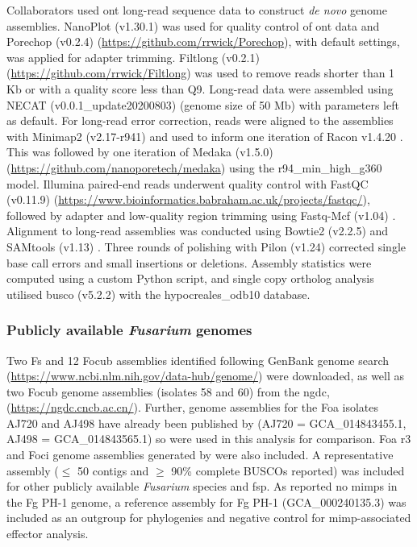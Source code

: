 Collaborators used \Ac{ont} long-read sequence data to construct \textit{de novo} genome assemblies. NanoPlot (v1.30.1) \parencite{DeCoster2018} was used for quality control of \ac{ont} data and Porechop (v0.2.4) (\href{https://github.com/rrwick/Porechop}{https://github.com/rrwic\-k/Porechop}), with default settings, was applied for adapter trimming. Filtlong (v0.2.1)  (\href{https://github.com/rrwick/Filtlong}{https://github.com/rrwick/Filtlong}) was used to remove reads shorter than 1 Kb or with a quality score less than Q9. Long-read data were assembled using NECAT (v0.0.1\_update20200803) \parencite{Chen2021} (genome size of 50 Mb) with parameters left as default. For long-read error correction, reads were aligned to the assemblies with Minimap2 (v2.17-r941) \parencite{Li2018} and used to inform one iteration of Racon v1.4.20 \parencite{Vaser2017}. This was followed by one iteration of Medaka (v1.5.0) (\href{https://github.com/nanoporetech/medaka}{https://github.com/nanoporetech/medaka}) using the r94\_min\_high\_g360 model. Illumina paired-end reads underwent quality control with FastQC (v0.11.9) (\href{https://www.bioinformatics.babraham.ac.uk/projects/fastqc/}{https://www.bioinformatics.babraham.ac.uk/projects/fastqc/}), followed by adapter and low-quality region trimming using Fastq-Mcf (v1.04) \parencite{Aronesty2013}. Alignment to long-read assemblies was conducted using Bowtie2 (v2.2.5) \parencite{Langmead2012} and SAMtools (v1.13) \Parencite{Danecek2021}. Three rounds of polishing with Pilon (v1.24) \parencite{Walker2014} corrected single base call errors and small insertions or deletions. Assembly statistics were computed using a custom Python script, and single copy ortholog analysis utilised \ac{busco} (v5.2.2) \parencite{Simao2015} with the hypocreales\_odb10 database.

\subsubsection{Publicly available \textit{Fusarium} genomes}

Two \ac{Fs} and 12 \ac{Focub} assemblies identified following GenBank genome search (\href{https://www.ncbi.nlm.nih.gov/data-hub/genome}{https://ww\-w.ncbi.nlm.nih.gov/data-hub/genome/}) were downloaded, as well as two \ac{Focub} genome assemblies (isolates 58 and 60) from the \ac{ngdc}, (\href{https://ngdc.cncb.ac.cn}{https:/\-/ngdc.cncb.ac.cn/}). Further, genome assemblies for the \ac{Foa} isolates AJ720 and AJ498 have already been published by \textcite{Henry2020} (AJ720 = GCA\_014843455.1,  AJ498 = GCA\_014843565.1) so were used in this analysis for comparison. \Ac{Foa} \ac{r3} and \ac{Foci} genome assemblies generated by \textcite{Henry2020} were also included. A representative assembly (\( \leq \) 50 contigs and \(\geq \) 90\% complete BUSCOs reported) was included for other publicly available \textit{Fusarium} species and \ac{fsp}. As \textcite{Schmidt2013} reported no \acp{mimp} in the \ac{Fg} PH-1 genome, a reference assembly for \ac{Fg} PH-1 (GCA\_000240135.3) was included as an outgroup for phylogenies and negative control for \ac{mimp}-associated effector analysis.

